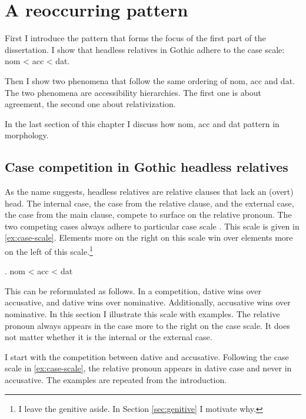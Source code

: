 
\chapter{A reoccurring pattern}

First I introduce the pattern that forms the focus of the first part of the dissertation. I show that headless relatives in Gothic adhere to the case scale: \ac{nom} < \ac{acc} < \ac{dat}.

Then I show two phenomena that follow the same ordering of \ac{nom}, \ac{acc} and \ac{dat}. The two phenomena are accessibility hierarchies. The first one is about agreement, the second one about relativization.

In the last section of this chapter I discuss how \ac{nom}, \ac{acc} and \ac{dat} pattern in morphology.


\section{Case competition in Gothic headless relatives}

As the name suggests, headless relatives are relative clauses that lack an (overt) head. The internal case, the case from the relative clause, and the external case, the case from the main clause, compete to surface on the relative pronoun. The two competing cases always adhere to particular case scale \citep[cf.][]{harbert1978,pittner1995,vogel2001,grosu2003,caha2019}. This scale is given in \ref{ex:case-scale}. Elements more on the right on this scale win over elements more on the left of this scale.\footnote{
I leave the genitive aside. In Section \ref{sec:genitive} I motivate why.
}

\ex. \ac{nom} < \ac{acc} < \ac{dat}\label{ex:case-scale}

This can be reformulated as follows. In a competition, dative wins over accusative, and dative wins over nominative. Additionally, accusative wins over nominative. In this section I illustrate this scale with examples. The relative pronoun always appears in the case more to the right on the case scale. It does not matter whether it is the internal or the external case.

I start with the competition between dative and accusative. Following the case scale in \ref{ex:case-scale}, the relative pronoun appears in dative case and never in accusative. The examples are repeated from the introduction.

